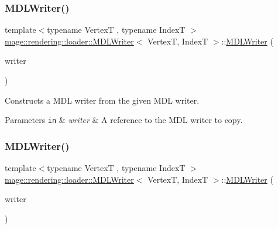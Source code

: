 \subsubsection{\texorpdfstring{M\+D\+L\+Writer()}{MDLWriter()}\hspace{0.1cm}{\footnotesize\ttfamily [2/3]}}
{\footnotesize\ttfamily template$<$typename VertexT , typename IndexT $>$ \\
\mbox{\hyperlink{classmage_1_1rendering_1_1loader_1_1_m_d_l_writer}{mage\+::rendering\+::loader\+::\+M\+D\+L\+Writer}}$<$ VertexT, IndexT $>$\+::\mbox{\hyperlink{classmage_1_1rendering_1_1loader_1_1_m_d_l_writer}{M\+D\+L\+Writer}} (\begin{DoxyParamCaption}\item[{const \mbox{\hyperlink{classmage_1_1rendering_1_1loader_1_1_m_d_l_writer}{M\+D\+L\+Writer}}$<$ VertexT, IndexT $>$ \&}]{writer }\end{DoxyParamCaption})\hspace{0.3cm}{\ttfamily [delete]}}

Constructs a M\+DL writer from the given M\+DL writer.


\begin{DoxyParams}[1]{Parameters}
\mbox{\tt in}  & {\em writer} & A reference to the M\+DL writer to copy. \\
\hline
\end{DoxyParams}
\mbox{\label{classmage_1_1rendering_1_1loader_1_1_m_d_l_writer_a27f71b3a27f96e263948d19b8b570309}} 
\subsubsection{\texorpdfstring{M\+D\+L\+Writer()}{MDLWriter()}\hspace{0.1cm}{\footnotesize\ttfamily [3/3]}}
{\footnotesize\ttfamily template$<$typename VertexT , typename IndexT $>$ \\
\mbox{\hyperlink{classmage_1_1rendering_1_1loader_1_1_m_d_l_writer}{mage\+::rendering\+::loader\+::\+M\+D\+L\+Writer}}$<$ VertexT, IndexT $>$\+::\mbox{\hyperlink{classmage_1_1rendering_1_1loader_1_1_m_d_l_writer}{M\+D\+L\+Writer}} (\begin{DoxyParamCaption}\item[{\mbox{\hyperlink{classmage_1_1rendering_1_1loader_1_1_m_d_l_writer}{M\+D\+L\+Writer}}$<$ VertexT, IndexT $>$ \&\&}]{writer }\end{DoxyParamCaption})\hspace{0.3cm}{\ttfamily [noexcept]}}

